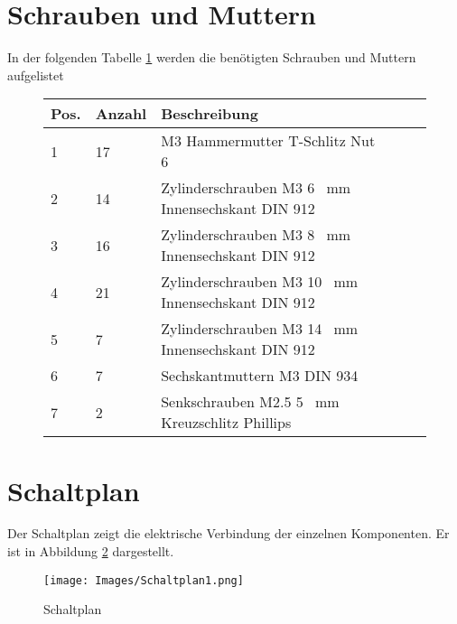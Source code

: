 \section{Schrauben und Muttern }

In der folgenden Tabelle \ref{Verbrauch} werden die benötigten Schrauben und Muttern aufgelistet

\begin{figure}[H]
	\begin{center}
		\fontsize{8}{10}\selectfont
		\begin{tabularx}{\textwidth}{|p{0.5cm}|p{}|X|X|X|X|} 
			\hline 
			\textbf{Pos.} &  \textbf{Anzahl} &  \textbf{Beschreibung}\\ \hline
			1 & 17 & M3 Hammermutter T-Schlitz Nut 6  \\ \hline
			2 & 14 & Zylinderschrauben M3 6 \ mm Innensechskant DIN 912  \\ \hline
			3 & 16 & Zylinderschrauben M3 8 \ mm Innensechskant DIN 912 \\ \hline
			4 & 21 & Zylinderschrauben M3 10 \ mm Innensechskant DIN 912\\ \hline
			5 & 7  & Zylinderschrauben M3 14 \ mm Innensechskant DIN 912 \\ \hline
			6 & 7 & Sechskantmuttern M3 DIN 934  \\ \hline
			7 & 2 &  Senkschrauben M2.5 5 \ mm Kreuzschlitz Phillips  \\ \hline
			
		\end{tabularx}
			\label{Verbrauch}
	\end{center}
\end{figure}

\section{Schaltplan}

Der Schaltplan zeigt die elektrische Verbindung der einzelnen Komponenten. Er ist in Abbildung \ref{Splan} dargestellt.

\begin{figure}[H]
	\begin{center}
		\texttt{[image: Images/Schaltplan1.png]}
		\caption{Schaltplan} \label{Splan}
	\end{center}
\end{figure}

 
